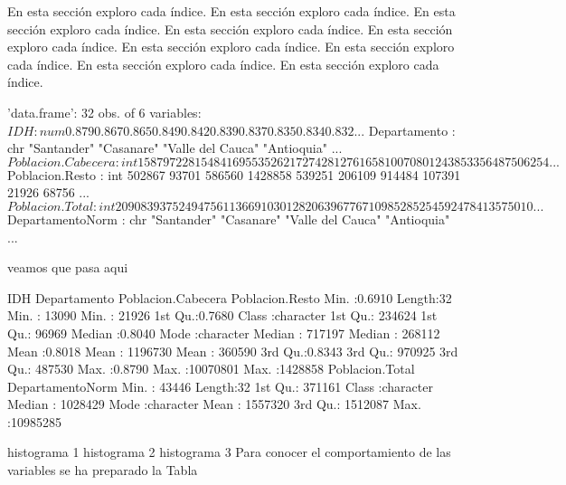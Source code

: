 \documentclass{article}
\begin{document}
En esta sección exploro cada índice. En esta sección exploro cada índice. En esta sección exploro cada índice. En esta sección exploro cada índice. En esta sección exploro cada índice. En esta sección exploro cada índice. En esta sección exploro cada índice. En esta sección exploro cada índice. En esta sección exploro cada índice.



\begin{Schunk}
\begin{Soutput}
'data.frame':	32 obs. of  6 variables:
 $ IDH               : num  0.879 0.867 0.865 0.849 0.842 0.839 0.837 0.835 0.834 0.832 ...
 $ Departamento      : chr  "Santander" "Casanare" "Valle del Cauca" "Antioquia" ...
 $ Poblacion.Cabecera: int  1587972 281548 4169553 5262172 742812 761658 10070801 2438533 56487 506254 ...
 $ Poblacion.Resto   : int  502867 93701 586560 1428858 539251 206109 914484 107391 21926 68756 ...
 $ Poblacion.Total   : int  2090839 375249 4756113 6691030 1282063 967767 10985285 2545924 78413 575010 ...
 $ DepartamentoNorm  : chr  "Santander" "Casanare" "Valle del Cauca" "Antioquia" ...
\end{Soutput}
\end{Schunk}

veamos que pasa aqui
\begin{Schunk}
\begin{Soutput}
      IDH         Departamento       Poblacion.Cabecera Poblacion.Resto  
 Min.   :0.6910   Length:32          Min.   :   13090   Min.   :  21926  
 1st Qu.:0.7680   Class :character   1st Qu.:  234624   1st Qu.:  96969  
 Median :0.8040   Mode  :character   Median :  717197   Median : 268112  
 Mean   :0.8018                      Mean   : 1196730   Mean   : 360590  
 3rd Qu.:0.8343                      3rd Qu.:  970925   3rd Qu.: 487530  
 Max.   :0.8790                      Max.   :10070801   Max.   :1428858  
 Poblacion.Total    DepartamentoNorm  
 Min.   :   43446   Length:32         
 1st Qu.:  371161   Class :character  
 Median : 1028429   Mode  :character  
 Mean   : 1557320                     
 3rd Qu.: 1512087                     
 Max.   :10985285                     
\end{Soutput}
\end{Schunk}
histograma 1 
histograma 2
histograma 3
Para conocer el comportamiento de las variables se ha preparado la Tabla %
\end{document}
